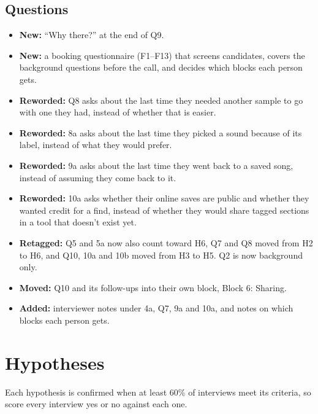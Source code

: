 \documentclass[12pt,a4paper]{report}
\begin{document}
\subsection{Questions}
\begin{itemize}[leftmargin=*, itemsep=2pt]
\item \textbf{New:} “Why there?” at the end of Q9.
\item \textbf{New:} a booking questionnaire (F1–F13) that screens candidates, covers the background questions before the call, and decides which blocks each person gets.
\item \textbf{Reworded:} Q8 asks about the last time they needed another sample to go with one they had, instead of whether that is easier.
\item \textbf{Reworded:} 8a asks about the last time they picked a sound because of its label, instead of what they would prefer.
\item \textbf{Reworded:} 9a asks about the last time they went back to a saved song, instead of assuming they come back to it.
\item \textbf{Reworded:} 10a asks whether their online saves are public and whether they wanted credit for a find, instead of whether they would share tagged sections in a tool that doesn’t exist yet.
\item \textbf{Retagged:} Q5 and 5a now also count toward H6, Q7 and Q8 moved from H2 to H6, and Q10, 10a and 10b moved from H3 to H5. Q2 is now background only.
\item \textbf{Moved:} Q10 and its follow-ups into their own block, Block 6: Sharing.
\item \textbf{Added:} interviewer notes under 4a, Q7, 9a and 10a, and notes on which blocks each person gets.
\end{itemize}

\section{Hypotheses}
Each hypothesis is confirmed when at least 60\% of interviews meet its criteria, so score every interview yes or no against each one.
\end{document}
